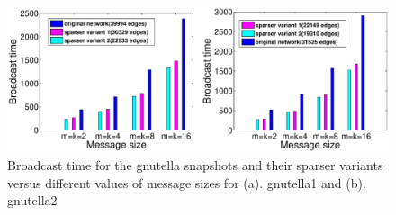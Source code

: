 
\begin{figure}
\centering
\includegraphics[scale=0.25]{./texfiles/Chapter_3/netsci/figs1/gnutella1_gnutella2.eps}
\caption{Broadcast time for the gnutella snapshots and their sparser variants versus different values of message sizes for (a). gnutella1 and (b). gnutella2}
\label{gnutellasparse}
\end{figure}
\medskip

 \medskip
